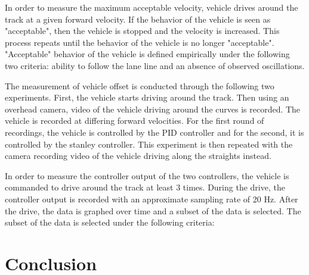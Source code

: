 \documentclass[arbeit=studie,oneside,BCOR=12mm]{ArbeitRST}
\begin{document}
In order to measure the maximum acceptable velocity, vehicle drives around the
track at a given forward velocity. If the behavior of the vehicle is seen as
"acceptable", then the vehicle is stopped and the velocity is increased. This
process repeats until the behavior of the vehicle is no longer "acceptable".
"Acceptable" behavior of the vehicle is defined empirically under the following
two criteria: ability to follow the lane line and an absence of observed
oscillations.

The measurement of vehicle offset is conducted through the following two
experiments. First, the vehicle starts driving around the track. Then using an
overhead camera, video of the vehicle driving around the curves is recorded.
The vehicle is recorded at differing forward velocities. For the first round of
recordings, the vehicle is controlled by the PID controller and for the second,
it is controlled by the stanley controller. This experiment is then repeated
with the camera recording video of the vehicle driving along the straights
instead. 

In order to measure the controller output of the two controllers, the vehicle
is commanded to drive around the track at least 3 times. During the drive, the
controller output is recorded with an approximate sampling rate of 20 Hz. After
the drive, the data is graphed over time and a subset of the data is selected.
The subset of the data is selected under the following criteria: 


\chapter{Conclusion}
\end{document}
